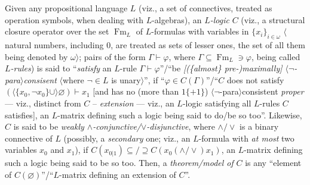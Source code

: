 \documentclass[bsl,meeting]{asl}
\newcommand{\NP}{}
\newcommand{\mf}[1]{\mathfrak{#1}}
\newcommand{\FA}{\mf{Fm}}
\DeclareMathOperator{\Fm}{Fm}
\DeclareMathOperator{\img}{img}
\begin{document}
\thispagestyle{empty}


\NP
{}



Given any propositional language $L$
(viz., a set of connectives,
treated as operation symbols, when dealing
with $L$-algebras),
an {\em $L$-logic\/} $C$ %
(viz., a structural %
closure operator over the set $\Fm_L$
of $L$-formulas
with variables in %
$\{x_i\}_{i\in\omega}$
$\langle$natural numbers, including $0$,
are treated as sets of lesser ones,
the set of all them being denoted by $\omega\rangle$;
pairs of the form $\Gamma\vdash\varphi$, where
$\Gamma\subseteq\Fm_L\ni\varphi$,
being called {\em $L$-rules\/})
is said to ``{\em satisfy\/} an $L$-rule $\Gamma\vdash\varphi$''/``be
{\em [(\/\{almost\/\} pre-)maximally]\/
$\langle\neg$-para\/$\rangle$consisent\/}
$\langle$whe\-re $\neg\in L$ is unary$\rangle$'',
if ``$\varphi\in C(\Gamma)$''/``$C$ does not satisfy
$(\langle\{x_0,\neg x_0\}\cup\rangle\varnothing)\vdash x_1$ [and has no (more than $1\{+1\}$)
$\langle\neg$-para$\rangle$consistent
{\em proper\/} --- viz., distinct from $C$ --
{\em extension\/} --- viz., an $L$-logic satisfying all $L$-rules
$C$ satisfies],
an $L$-matrix defining such a logic being said to do/be so too''.
Likewise, $C$ is said to be {\em weakly\/
$\land$-conjunctive/\/$\lor$-disjunctive},
where $\land/\lor$ is a binary connective of
$L$ (possibly, a {\em secondary\/} one; viz.,
an $L$-formula with {\em at most\/} two variables $x_0$ and $x_1$),
if $C(x_{0|1})\subseteq/\supseteq C(x_0(\land/\lor)x_1)$,
an $L$-matrix defining such a logic being said to be so too.
Then, a {\em theorem/model of\/} $C$ is any
``element of $C(\varnothing)$''/``$L$-matrix defining an
extension of $C$''.
\end{document}
